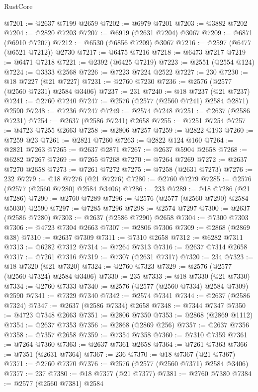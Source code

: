 \begin{lexlean}{RustCore}
\begin{coremodule}
@7201 := @2637 @7199 @2659
@7202 := @6979 @7201
@7203 := @3882 @7202
@7204 := @2820 @7203
@7207 := @6919 (@2631 @7204) @3067
@7209 := @6871 (@6910 @7207)
@7212 := @6530 (@6856 @7209) @3067
@7216 := @2597 (@6477 (@6521 @7212)) @2730
@7217 := @6475 @7216
@7218 := @6473 @7217
@7219 := @6471 @7218
@7221 := @2392 (@6425 @7219)
@7223 := @2551 (@2554 @124)
@7224 := @3333 @2568
@7226 := @7223 @7224 @2522
@7227 := 230
@7230 := @18 @7227 (@21 @7227)
@7231 := @2760 @7230
@7236 := @2576 (@2577 (@2560 @7231) @2584 @3406)
@7237 := 231
@7240 := @18 @7237 (@21 @7237)
@7241 := @2760 @7240
@7247 := @2576 (@2577 (@2560 @7241) @2584 @2871) @2590
@7248 := @7236 @7247
@7249 := @2574 @7248
@7251 := @2637 (@2586 @7231)
@7254 := @2637 (@2586 @7241) @2658
@7255 := @7251 @7254
@7257 := @4723 @7255 @2663
@7258 := @2806 @7257
@7259 := @2822 @193
@7260 := @7259 @23
@7261 := @2821 @7260
@7263 := @2822 @124 @160
@7264 := @2821 @7263
@7265 := @2637 @2871
@7267 := @2637 @5904 @2658
@7268 := @6282 @7267
@7269 := @7265 @7268
@7270 := @7264 @7269
@7272 := @2637 @7270 @2658
@7273 := @7261 @7272
@7275 := @7258 (@2631 @7273)
@7276 := 232
@7279 := @18 @7276 (@21 @7276)
@7280 := @2760 @7279
@7285 := @2576 (@2577 (@2560 @7280) @2584 @3406)
@7286 := 233
@7289 := @18 @7286 (@21 @7286)
@7290 := @2760 @7289
@7296 := @2576 (@2577 (@2560 @7290) @2584 @5030) @2590
@7297 := @7285 @7296
@7298 := @2574 @7297
@7300 := @2637 (@2586 @7280)
@7303 := @2637 (@2586 @7290) @2658
@7304 := @7300 @7303
@7306 := @4723 @7304 @2663
@7307 := @2806 @7306
@7309 := @2868 (@2869 @38)
@7310 := @2637 @7309
@7311 := @7310 @2658
@7312 := @6282 @7311
@7313 := @6282 @7312
@7314 := @7264 @7313
@7316 := @2637 @7314 @2658
@7317 := @7261 @7316
@7319 := @7307 (@2631 @7317)
@7320 := 234
@7323 := @18 @7320 (@21 @7320)
@7324 := @2760 @7323
@7329 := @2576 (@2577 (@2560 @7324) @2584 @3406)
@7330 := 235
@7333 := @18 @7330 (@21 @7330)
@7334 := @2760 @7333
@7340 := @2576 (@2577 (@2560 @7334) @2584 @7309) @2590
@7341 := @7329 @7340
@7342 := @2574 @7341
@7344 := @2637 (@2586 @7324)
@7347 := @2637 (@2586 @7334) @2658
@7348 := @7344 @7347
@7350 := @4723 @7348 @2663
@7351 := @2806 @7350
@7353 := @2868 (@2869 @1112)
@7354 := @2637 @7353
@7356 := @2868 (@2869 @256)
@7357 := @2637 @7356
@7358 := @7357 @2658
@7359 := @7354 @7358
@7360 := @7310 @7359
@7361 := @7264 @7360
@7363 := @2637 @7361 @2658
@7364 := @7261 @7363
@7366 := @7351 (@2631 @7364)
@7367 := 236
@7370 := @18 @7367 (@21 @7367)
@7371 := @2760 @7370
@7376 := @2576 (@2577 (@2560 @7371) @2584 @3406)
@7377 := 237
@7380 := @18 @7377 (@21 @7377)
@7381 := @2760 @7380
@7384 := @2577 (@2560 @7381) @2584

\end{coremodule}
\end{lexlean}
